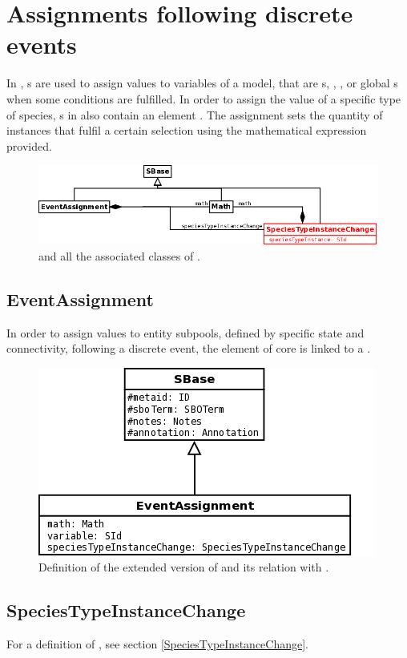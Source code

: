 \section{Assignments following discrete events}

In \sbmlLthreeVone, s are used to assign values to variables of a model, that are s, , , or global s  when some conditions are fulfilled. In order to assign the value of a specific type of species, s in \multiVone also contain an element . The assignment sets the quantity of instances that fulfil a certain selection using the mathematical expression provided. 

\begin{figure}[h!]
\begin{center}
\includegraphics[scale=0.3]{./figs/pngs/EventAssignmentGeneral.png}
\caption{ and all the associated classes of \multiVone.}
\end{center}
\end{figure}

\subsection{EventAssignment}

In order to assign values to entity subpools, defined by specific state and connectivity, following a discrete event, the element  of \sbmlLthreeVone core is linked to a .

\begin{figure}[H]
\begin{center}
\includegraphics[scale=0.4]{figs/pngs/EventAssignmentClass.png} 
\caption{Definition of the extended version of  and its relation with .}
\label{fig:EventAssignmentClass}
\end{center}
\end{figure}

\subsection{SpeciesTypeInstanceChange}

For a definition of , see section \ref{SpeciesTypeInstanceChange}.